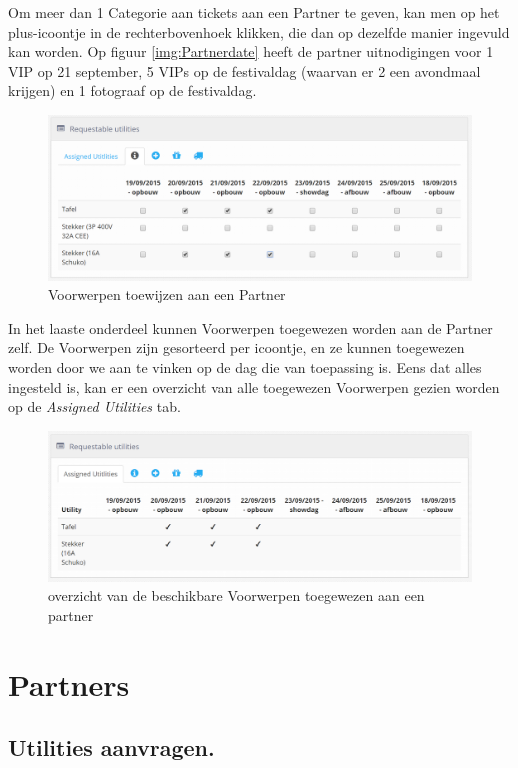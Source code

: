 \documentclass[]{memoir}
\begin{document}
Om meer dan 1 Categorie aan tickets aan een Partner te geven, kan men op het plus-icoontje in de rechterbovenhoek klikken, die dan op dezelfde manier ingevuld kan worden. 
Op figuur \ref{img:Partnerdate} heeft de  partner uitnodigingen voor 1 VIP op 21 september, 5 VIPs op de festivaldag (waarvan er 2 een avondmaal krijgen) en 1 fotograaf op de festivaldag.
\begin{figure}[H]
	\includegraphics[width=\linewidth]{addPartner_utilities}
	\caption{Voorwerpen toewijzen aan een Partner}
\end{figure}
In het laaste onderdeel kunnen Voorwerpen toegewezen worden aan de Partner zelf. De Voorwerpen zijn gesorteerd per icoontje, en ze kunnen toegewezen worden door we aan te vinken op de dag die van toepassing is. Eens dat alles ingesteld is, kan er een overzicht van alle toegewezen Voorwerpen gezien worden op de \textsl{Assigned Utilities} tab. 
\begin{figure}[H]
	\includegraphics[width=\linewidth]{addPartner_utilities_main}
	\caption{overzicht van de beschikbare Voorwerpen toegewezen aan een partner}
\end{figure}

\section{Partners} \label{PartnerInstr}
\subsection{Utilities aanvragen.} \label{RequestMaterial}
\end{document}
